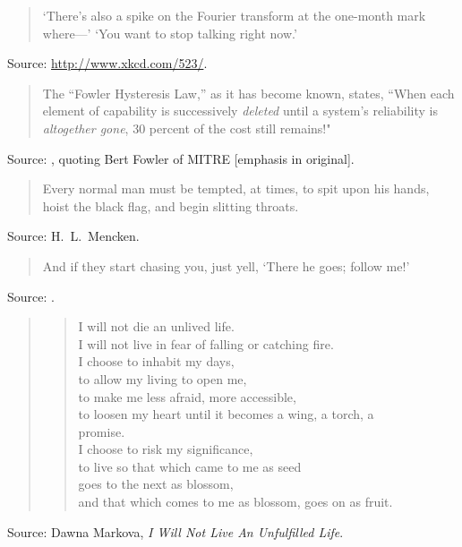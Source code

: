 \documentclass[a4paper]{article}
\begin{document}
\begin{quote}
	`There's also a spike on the Fourier transform at the one-month
	mark where---' `You want to stop talking right now.'
\end{quote}
Source: \url{http://www.xkcd.com/523/}.
\medskip

\begin{quote}
	The ``Fowler Hysteresis Law,'' as it has become known, states,
	``When each element of capability is successively \emph{deleted}
	until a system's reliability is \emph{altogether gone}, 30
	percent of the cost still remains!"
\end{quote}
Source: \citet[p.~102]{Augustine1997}, quoting Bert Fowler of MITRE
[emphasis in original].
\medskip

\begin{quote}
	Every normal man must be tempted, at times, to spit upon his
	hands, hoist the black flag, and begin slitting throats.
\end{quote}
Source: H.~L.~Mencken.
\medskip

\begin{quote}
	And if they start chasing you, just yell, `There he goes; follow me!'
\end{quote}
Source: \citet{Piper2007}.
\medskip

\begin{quote}
	\begin{verse}
		\begin{centering}
			I will not die an unlived life. \\
			I will not live in fear of falling or catching fire. \\
			I choose to inhabit my days, \\
			to allow my living to open me, \\
			to make me less afraid, more accessible, \\
			to loosen my heart until it becomes a wing, a torch, a \\
			promise. \\
			I choose to risk my significance, \\
			to live so that which came to me as seed \\
			goes to the next as blossom, \\
			and that which comes to me as blossom, goes on as fruit. \\
		\end{centering}
	\end{verse}
\end{quote}
Source: Dawna Markova, \emph{I Will Not Live An Unfulfilled Life}.
\medskip
\end{document}
